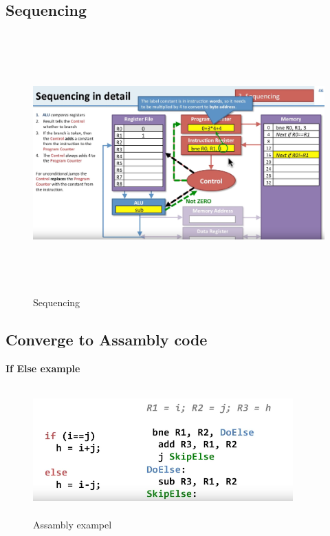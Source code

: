 \documentclass{article}
\begin{document}
\newpage

\subsection{Sequencing}
\begin{figure}[h]
    \vspace{10mm}
    \centering
    \includegraphics[width=16cm, height=10cm]{image/sequencing.png} 
    \caption{Sequencing}
\end{figure}
\newpage

\subsection{Converge to Assambly code}
\noindent\textbf{If Else example} \newline
\begin{figure}[h]
    \vspace{10mm}
    \centering
    \includegraphics[width=10cm, height=5cm]{image/assambly-exampel.png} 
    \caption{Assambly exampel}
\end{figure}
\end{document}
